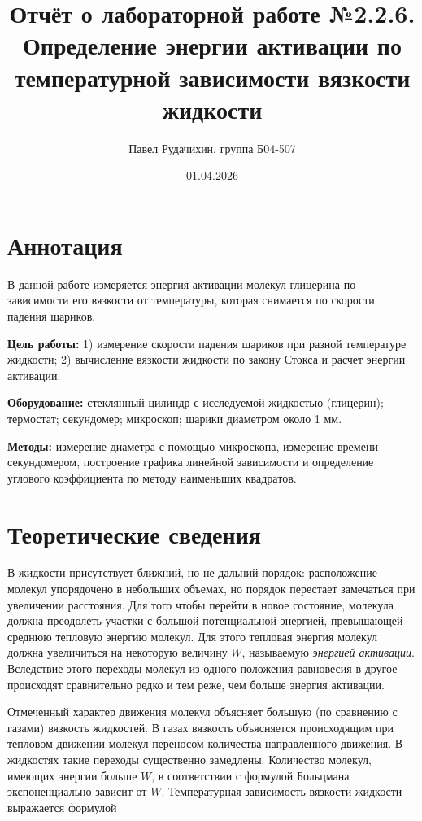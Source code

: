 \documentclass{article}
\title{Отчёт о лабораторной работе №2.2.6. \\ Определение энергии активации по температурной зависимости вязкости жидкости}
\author{Павел Рудачихин, группа Б04-507}
\date{01.04.2026}
\begin{document}
\maketitle
	\section*{Аннотация}
		
		
		\hspace{4mm} В данной работе измеряется энергия активации молекул глицерина по зависимости его вязкости от температуры, которая снимается по скорости падения шариков.
		
		
		\textbf{Цель работы:}  1) измерение скорости падения шариков при разной температуре жидкости; 2) вычисление вязкости жидкости по закону Стокса и расчет энергии активации.
		
		
		\textbf{Оборудование:}  стеклянный цилиндр с исследуемой жидкостью (глицерин); термостат; секундомер; микроскоп; шарики диаметром около 1 мм.
		
		
		\textbf{Методы:} измерение диаметра с помощью микроскопа, измерение времени секундомером, построение графика линейной зависимости и определение углового коэффициента по методу наименьших квадратов.

	
	 
	
\section*{Теоретические сведения}
	
	\hspace{4mm} В жидкости присутствует ближний, но не дальний порядок:	расположение молекул упорядочено в небольших объемах, но порядок перестает замечаться при увеличении расстояния. Для того чтобы перейти в новое состояние, молекула должна преодолеть участки с большой потенциальной энергией, превышающей среднюю тепловую энергию молекул. Для этого тепловая энергия молекул должна увеличиться на некоторую величину $W$, называемую \textit{энергией активации}. Вследствие этого переходы молекул из одного положения равновесия в другое происходят сравнительно редко и тем реже, чем больше энергия активации.
	
	
	Отмеченный характер движения молекул объясняет большую (по сравнению с газами) вязкость жидкостей. В газах вязкость объясняется происходящим при тепловом движении молекул переносом количества направленного движения. В жидкостях такие переходы существенно замедлены. Количество молекул, имеющих энергии больше $W$, в соответствии с формулой Больцмана экспоненциально зависит от $W$. Температурная зависимость вязкости жидкости выражается формулой
	
\end{document}
